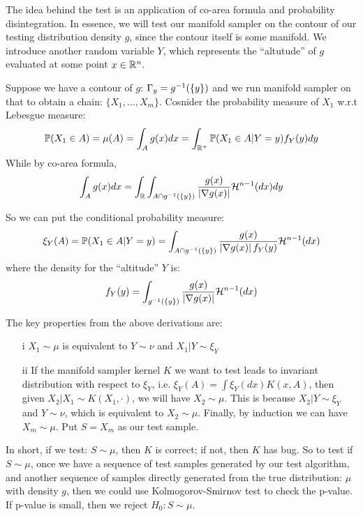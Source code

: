 \documentclass{article}
\begin{document}
The idea behind the test is an application of co-area formula and probability disintegration. In essence, we will test our manifold sampler on the contour of our testing distribution density $g$, since the contour itself is some manifold. We introduce another random variable $Y$, which represents the ``altutude'' of $g$ evaluated at some point $x \in \mathbb R^n$. 

Suppose we have a contour of $g$: $\Gamma_y = g^{-1}(\{y\})$ and we run manifold sampler on that to obtain a chain: $\{X_1, \ldots, X_m\}$. Cosnider the probability measure of $X_1$ w.r.t Lebesgue measure:
\[\mathbb{P}(X_1 \in A)= \mu(A) = \int_A g(x)dx = \int_{\mathbb R^+} \mathbb{P}(X_1\in A | Y = y) f_Y(y) dy\]
While by co-area formula, \[\int_A g(x) dx = \int_{\mathbb R} \int_{A \cap g^{-1}(\{y\})} \frac{g(x)}{\left|\nabla g(x)\right|} {\cal H}^{n-1}(dx)dy\]

So we can put the conditional probability measure: \[\xi_Y(A) = \mathbb{P}(X_1 \in A | Y = y) = \int_{A \cap g^{-1}(\{y\})} \frac{g(x)}{\left|\nabla g(x)\right| f_Y(y)} {\cal H}^{n-1}(dx)\]where the density for the ``altitude'' $Y$ is: \[f_Y(y) = \int_{g^{-1}(\{y\})} \frac{g(x)}{\left|\nabla g(x)\right|} {\cal H}^{n-1}(dx)\]

The key properties from the above derivations are:
\begin{enumerate}
\item[i]
$X_1 \sim \mu$ is equivalent to $Y \sim \nu$ and $X_1 | Y \sim \xi_Y$
\item[ii]
If the manifold sampler kernel $K$ we want to test leads to invariant distribution with respect to $\xi_Y$, i.e. $\xi_Y(A) = \int \xi_Y(dx) K(x, A)$, then given $X_2 |X_1 \sim K(X_1, \cdot)$, we will have $X_2 \sim \mu$. This is because $X_2 | Y \sim \xi_Y$ and $Y \sim \nu$, which is equivalent to $X_2 \sim \mu$. Finally, by induction we can have $X_m \sim \mu$. Put $S = X_m$ as our test sample.
\end{enumerate}
In short, if we test: $S \sim \mu$, then $K$ is correct; if not, then $K$ has bug. So to test if $S \sim \mu$, once we have a sequence of test samples generated by our test algorithm, and another sequence of samples directly generated from the true distribution: $\mu$ with density $g$, then we could use Kolmogorov-Smirnov test to check the p-value. If p-value is small, then we reject $H_0: S \sim \mu$.

\end{document}
